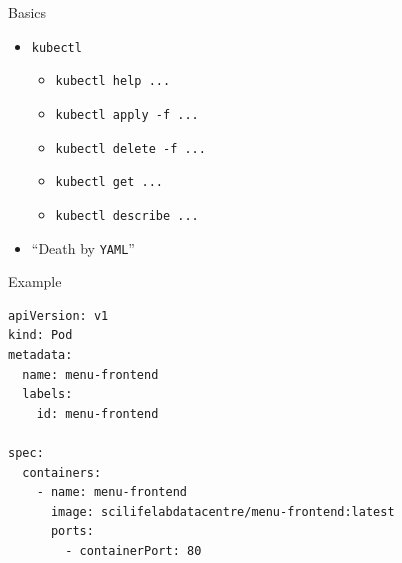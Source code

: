 \documentclass{dcpresentation}
\begin{document}
 
 \begin{frame}{Basics}
  \begin{itemize}
   \item \texttt{kubectl}
   \begin{itemize}
    \item \texttt{kubectl help ...}
    \item \texttt{kubectl apply -f ...}
    \item \texttt{kubectl delete -f ...}
    \item \texttt{kubectl get ...}
    \item \texttt{kubectl describe ...}
   \end{itemize}
   \item ``Death by \texttt{YAML}''
  \end{itemize}
 \end{frame}
  
 \begin{frame}[fragile]{Example}
  \small
  \begin{verbatim}
apiVersion: v1
kind: Pod
metadata:
  name: menu-frontend
  labels:
    id: menu-frontend

spec:
  containers:
    - name: menu-frontend
      image: scilifelabdatacentre/menu-frontend:latest
      ports:
        - containerPort: 80
  \end{verbatim}
 \end{frame}
 
\end{document}
